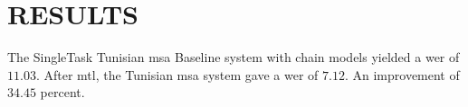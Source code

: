   \section{RESULTS}
\label{sec-5}

The SingleTask Tunisian \gls{msa} Baseline system with chain models yielded a \gls{wer} of $11.03$.%
After \gls{mtl}, the Tunisian \gls{msa} system gave a \gls{wer} of $7.12$. %
An improvement of $34.45$ percent.